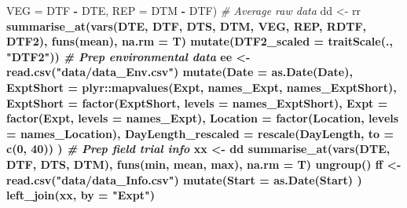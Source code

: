 \documentclass[
]{article}
\newenvironment{Shaded}{\begin{snugshade}}{\end{snugshade}}
\newcommand{\CommentTok}[1]{\textcolor[rgb]{0.56,0.35,0.01}{\textit{#1}}}
\newcommand{\DataTypeTok}[1]{\textcolor[rgb]{0.13,0.29,0.53}{#1}}
\newcommand{\DecValTok}[1]{\textcolor[rgb]{0.00,0.00,0.81}{#1}}
\newcommand{\KeywordTok}[1]{\textcolor[rgb]{0.13,0.29,0.53}{\textbf{#1}}}
\newcommand{\NormalTok}[1]{#1}
\newcommand{\OperatorTok}[1]{\textcolor[rgb]{0.81,0.36,0.00}{\textbf{#1}}}
\newcommand{\StringTok}[1]{\textcolor[rgb]{0.31,0.60,0.02}{#1}}
\begin{document}
\begin{Shaded}
\begin{Highlighting}[]
{{{{{         \DataTypeTok{VEG          =}\NormalTok{ DTF }\OperatorTok{-}\StringTok{ }\NormalTok{DTE,}
         \DataTypeTok{REP          =}\NormalTok{ DTM }\OperatorTok{-}\StringTok{ }\NormalTok{DTF)}
\CommentTok{# Average raw data}
\NormalTok{dd <-}\StringTok{ }\NormalTok{rr }\OperatorTok{%
\StringTok{  }\KeywordTok{summarise_at}\NormalTok{(}\KeywordTok{vars}\NormalTok{(DTE, DTF, DTS, DTM, VEG, REP, RDTF, DTF2),}
               \KeywordTok{funs}\NormalTok{(mean), }\DataTypeTok{na.rm =}\NormalTok{ T) }\OperatorTok{%
\StringTok{  }\KeywordTok{mutate}\NormalTok{(}\DataTypeTok{DTF2_scaled =} \KeywordTok{traitScale}\NormalTok{(., }\StringTok{"DTF2"}\NormalTok{))}
\CommentTok{# Prep environmental data}
\NormalTok{ee <-}\StringTok{ }\KeywordTok{read.csv}\NormalTok{(}\StringTok{"data/data_Env.csv"}\NormalTok{) }\OperatorTok{%
\StringTok{  }\KeywordTok{mutate}\NormalTok{(}\DataTypeTok{Date      =} \KeywordTok{as.Date}\NormalTok{(Date),}
         \DataTypeTok{ExptShort =}\NormalTok{ plyr}\OperatorTok{::}\KeywordTok{mapvalues}\NormalTok{(Expt, names_Expt, names_ExptShort),}
         \DataTypeTok{ExptShort =} \KeywordTok{factor}\NormalTok{(ExptShort, }\DataTypeTok{levels =}\NormalTok{ names_ExptShort),}
         \DataTypeTok{Expt      =} \KeywordTok{factor}\NormalTok{(Expt,      }\DataTypeTok{levels =}\NormalTok{ names_Expt),}
         \DataTypeTok{Location  =} \KeywordTok{factor}\NormalTok{(Location,  }\DataTypeTok{levels =}\NormalTok{ names_Location),}
         \DataTypeTok{DayLength_rescaled =} \KeywordTok{rescale}\NormalTok{(DayLength, }\DataTypeTok{to =} \KeywordTok{c}\NormalTok{(}\DecValTok{0}\NormalTok{, }\DecValTok{40}\NormalTok{)) )}
\CommentTok{# Prep field trial info}
\NormalTok{xx <-}\StringTok{ }\NormalTok{dd }\OperatorTok{%
\StringTok{  }\KeywordTok{summarise_at}\NormalTok{(}\KeywordTok{vars}\NormalTok{(DTE, DTF, DTS, DTM), }\KeywordTok{funs}\NormalTok{(min, mean, max), }\DataTypeTok{na.rm =}\NormalTok{ T) }\OperatorTok{%
\StringTok{  }\KeywordTok{ungroup}\NormalTok{()}
\NormalTok{ff <-}\StringTok{ }\KeywordTok{read.csv}\NormalTok{(}\StringTok{"data/data_Info.csv"}\NormalTok{) }\OperatorTok{%
\StringTok{  }\KeywordTok{mutate}\NormalTok{(}\DataTypeTok{Start =} \KeywordTok{as.Date}\NormalTok{(Start) ) }\OperatorTok{%
\StringTok{  }\KeywordTok{left_join}\NormalTok{(xx, }\DataTypeTok{by =} \StringTok{"Expt"}\NormalTok{)}
}}}}}}}}}}}}
\end{Highlighting}
\end{Shaded}
\end{document}
